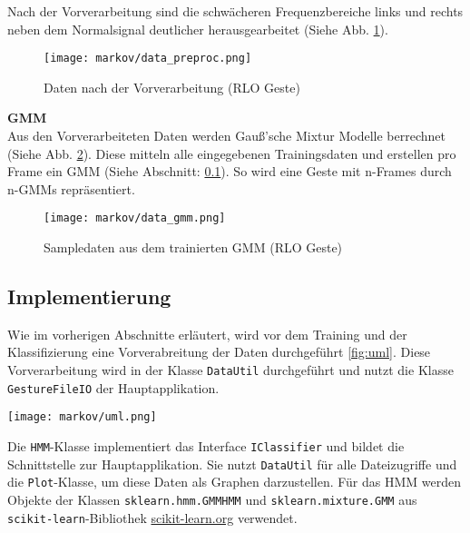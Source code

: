 Nach der Vorverarbeitung sind die schwächeren Frequenzbereiche links und rechts neben dem Normalsignal deutlicher 
herausgearbeitet (Siehe Abb. \ref{fig:data_preproc}).  

\begin{figure}[htbp] \centering
    \texttt{[image: markov/data\_preproc.png]}
    \caption{Daten nach der Vorverarbeitung (\acl{RLO} Geste)}
    \label{fig:data_preproc}
\end{figure}

\textbf{\acl{GMM}} \\
Aus den Vorverarbeiteten Daten werden Gauß’sche Mixtur Modelle berrechnet (Siehe Abb. \ref{fig:data_gmm}). 
Diese mitteln alle eingegebenen Trainingsdaten und erstellen pro Frame ein \acl{GMM} (Siehe Abschnitt: 
\ref{sec:impl}). So wird eine Geste mit n-Frames durch n-\acl{GMM}s repräsentiert.

\begin{figure}[htbp] \centering
    \texttt{[image: markov/data\_gmm.png]}
    \caption{Sampledaten aus dem trainierten \acl{GMM} (\acl{RLO} Geste)}
    \label{fig:data_gmm}
\end{figure}


\subsection{Implementierung}  \label{sec:impl}
Wie im vorherigen Abschnitte erläutert, wird vor dem Training und der Klassifizierung eine Vorverabreitung der Daten durchgeführt \ref{fig:uml}.
Diese Vorverarbeitung wird in der Klasse \texttt{DataUtil} durchgeführt und nutzt die Klasse \texttt{GestureFileIO} der Hauptapplikation.

\begin{figure*}[htbp] \centering
    \texttt{[image: markov/uml.png]}
    \caption{Klassendiagram und Abhängigkeiten des \acl{HMM} Klassifikators}
    \label{fig:uml}
\end{figure*}


Die \texttt{HMM}-Klasse implementiert das Interface \texttt{IClassifier} und bildet die Schnittstelle zur Hauptapplikation. Sie nutzt \texttt{DataUtil}
 für alle Dateizugriffe und die \texttt{Plot}-Klasse, um diese Daten als Graphen darzustellen. 
Für das \acl{HMM} werden Objekte der Klassen \texttt{sklearn.hmm.GMMHMM} und \texttt{sklearn.mixture.GMM} aus \texttt{scikit-learn}-Bibliothek \url{scikit-learn.org} verwendet.


